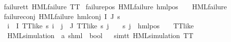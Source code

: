 \begin{isabellebody}
failure{\isacharunderscore}{\kern0pt}tt{\isacharcolon}{\kern0pt}\ {\isachardoublequoteopen}HML{\isacharunderscore}{\kern0pt}failure\ TT{\isachardoublequoteclose}\ {\isacharbar}{\kern0pt}\isanewline
failure{\isacharunderscore}{\kern0pt}pos{\isacharcolon}{\kern0pt}\ {\isachardoublequoteopen}HML{\isacharunderscore}{\kern0pt}failure\ {\isacharparenleft}{\kern0pt}hml{\isacharunderscore}{\kern0pt}pos\ {\isasymalpha}\ {\isasymphi}{\isacharparenright}{\kern0pt}{\isachardoublequoteclose}\ \ {\isachardoublequoteopen}HML{\isacharunderscore}{\kern0pt}failure\ {\isasymphi}{\isachardoublequoteclose}\ {\isacharbar}{\kern0pt}\isanewline
failure{\isacharunderscore}{\kern0pt}conj{\isacharcolon}{\kern0pt}\ {\isachardoublequoteopen}HML{\isacharunderscore}{\kern0pt}failure\ {\isacharparenleft}{\kern0pt}hml{\isacharunderscore}{\kern0pt}conj\ I\ J\ {\isasympsi}s{\isacharparenright}{\kern0pt}{\isachardoublequoteclose}\ \isanewline
{}\ {\isachardoublequoteopen}{\isacharparenleft}{\kern0pt}{\isasymforall}i\ {\isasymin}\ I{\isachardot}{\kern0pt}\ TT{\isacharunderscore}{\kern0pt}like\ {\isacharparenleft}{\kern0pt}{\isasympsi}s\ i{\isacharparenright}{\kern0pt}{\isacharparenright}{\kern0pt}\ {\isasymand}\ {\isacharparenleft}{\kern0pt}{\isasymforall}j\ {\isasymin}\ J{\isachardot}{\kern0pt}\ {\isacharparenleft}{\kern0pt}TT{\isacharunderscore}{\kern0pt}like\ {\isacharparenleft}{\kern0pt}{\isasympsi}s\ j{\isacharparenright}{\kern0pt}{\isacharparenright}{\kern0pt}\ {\isasymor}\ {\isacharparenleft}{\kern0pt}{\isasymexists}{\isasymalpha}\ {\isasymchi}{\isachardot}{\kern0pt}\ {\isacharparenleft}{\kern0pt}{\isacharparenleft}{\kern0pt}{\isasympsi}s\ j{\isacharparenright}{\kern0pt}\ {\isacharequal}{\kern0pt}\ hml{\isacharunderscore}{\kern0pt}pos\ {\isasymalpha}\ {\isasymchi}\ {\isasymand}\ {\isacharparenleft}{\kern0pt}TT{\isacharunderscore}{\kern0pt}like\ {\isasymchi}{\isacharparenright}{\kern0pt}{\isacharparenright}{\kern0pt}{\isacharparenright}{\kern0pt}{\isacharparenright}{\kern0pt}{\isachardoublequoteclose}\ \isanewline
\isanewline
{}\isamarkupfalse%
\ HML{\isacharunderscore}{\kern0pt}simulation\ {\isacharcolon}{\kern0pt}{\isacharcolon}{\kern0pt}\ {\isachardoublequoteopen}{\isacharparenleft}{\kern0pt}{\isacharprime}{\kern0pt}a{\isacharcomma}{\kern0pt}\ {\isacharprime}{\kern0pt}s{\isacharparenright}{\kern0pt}hml\ {\isasymRightarrow}\ bool{\isachardoublequoteclose}\isanewline
\ \ \isanewline
sim{\isacharunderscore}{\kern0pt}tt{\isacharcolon}{\kern0pt}\ {\isachardoublequoteopen}HML{\isacharunderscore}{\kern0pt}simulation\ TT{\isachardoublequoteclose}\ {\isacharbar}{\kern0pt}\isanewline

\end{isabellebody}
